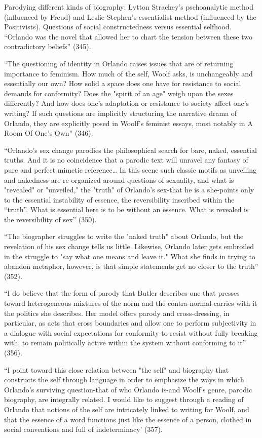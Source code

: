 \documentclass[11pt]{article}
\begin{document}
Parodying different kinds of biography: Lytton Strachey’s
pschoanalytic method (influenced by Freud) and Leslie Stephen’s
essentialist method (influenced by the Positivists). Questions of
social constructedness versus essential selfhood. “Orlando was the
novel that allowed her to chart the tension between these two
contradictory beliefs” (345).

“The questioning of identity in Orlando raises issues that are of
returning importance to feminism. How much of the self, Woolf asks, is
unchangeably and essentially our own? How solid a space does one have
for resistance to social demands for conformity? Does the "spirit of
an age" weigh upon the sexes differently? And how does one's
adaptation or resistance to society affect one's writing? If such
questions are implicitly structuring the narrative drama of Orlando,
they are explicitly posed in Woolf's feminist essays, most notably in
A Room Of One’s Own” (346).

“Orlando's sex change parodies the philosophical search for bare,
naked, essential truths. And it is no coincidence that a parodic text
will unravel any fantasy of pure and perfect mimetic reference… In
this scene such classic motifs as unveiling and nakedness are
re-organized around questions of sexuality, and what is "revealed" or
"unveiled," the "truth" of Orlando's sex-that he is a she-points only
to the essential instability of essence, the reversibility inscribed
within the “truth”. What is essential here is to be without an
essence. What is revealed is the reversibility of sex” (350).

“The biographer struggles to write the "naked truth" about Orlando,
but the revelation of his sex change tells us little. Likewise,
Orlando later gets embroiled in the struggle to "say what one means
and leave it." What she finds in trying to abandon metaphor, however,
is that simple statements get no closer to the truth” (352).

“I do believe that the form of parody that Butler describes-one that
presses toward heterogeneous mixtures of the norm and the
contra-normal-carries with it the politics she describes. Her model
offers parody and cross-dressing, in particular, as acts that cross
boundaries and allow one to perform subjectivity in a dialogue with
social expectations for conformity-to resist without fully breaking
with, to remain politically active within the system without
conforming to it” (356).

“I point toward this close relation between "the self" and biography
that constructs the self through language in order to emphasize the
ways in which Orlando's surviving question-that of who Orlando is-and
Woolf's genre, parodic biography, are integrally related. I would like
to suggest through a reading of Orlando that notions of the self are
intricately linked to writing for Woolf, and that the essence of a
word functions just like the essence of a person, clothed in social
conventions and full of indeterminacy’ (357).
\end{document}

